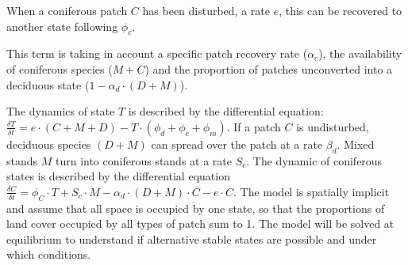 

When a coniferous patch $C$ has been disturbed, a rate $e$, this can be
recovered to another state following $\phi_c$. 


This term is taking in account a specific patch recovery rate ($\alpha_{c}$),
the availability of coniferous species ($M+C$) and the proportion of patches
unconverted into a deciduous state ($1- \alpha_d \cdot (D +M)$).


The dynamics of state $T$ is described by the differential equation:
$\frac{\delta T}{\delta t} = e \cdot (C+M+D) - T \cdot (\phi_d + \phi_c +
\phi_m)$. If a patch $C$ is undisturbed, deciduous species $(D+M)$ can spread
over the patch at a rate $\beta_d$. Mixed stands $M$ turn into
coniferous stands at a rate $S_c$.  The dynamic of coniferous states is described by the
differential equation $\frac{\delta C}{\delta t} = \phi_C \cdot T + S_c \cdot
M - \alpha_d \cdot (D+M)\cdot C - e \cdot C$. The model is spatially implicit and assume that all space is occupied by one
state, so that the proportions of land cover occupied by all types of patch
sum to 1. The model will be solved at equilibrium to understand if
alternative stable states are possible and under which conditions.\\


